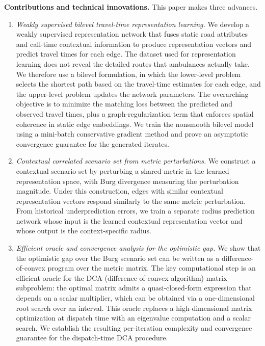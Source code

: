 \documentclass[11pt, letterpaper, oneside, reqno]{amsart}
\begin{document}
\noindent\textbf{Contributions and technical innovations.} This paper makes three advances.

\begin{enumerate}[leftmargin=7mm]
\item \textit{Weakly supervised bilevel travel-time representation learning.} 
We develop a weakly supervised representation network that fuses static road attributes and call-time contextual information to produce representation vectors and predict travel times for each edge. The dataset used for representation learning does not reveal the detailed routes that ambulances actually take. We therefore use a bilevel formulation, in which the lower-level problem selects the shortest path based on the travel-time estimates for each edge, and the upper-level problem updates the network parameters. The overarching objective is to minimize the matching loss between the predicted and observed travel times, plus a graph-regularization term that enforces spatial coherence in static edge embeddings. We train the nonsmooth bilevel model using a mini-batch conservative gradient method and prove an asymptotic convergence guarantee for the generated iterates.

\item \textit{Contextual correlated scenario set from metric perturbations.} We construct a contextual scenario set by perturbing a shared metric in the learned representation space, with Burg divergence measuring the perturbation magnitude. Under this construction, edges with similar contextual representation vectors respond similarly to the same metric perturbation. From historical underprediction errors, we train a separate radius prediction network whose input is the learned contextual representation vector and whose output is the context-specific radius.

\item \textit{Efficient oracle and convergence analysis for the optimistic gap.} We show that the optimistic gap over the Burg scenario set can be written as a difference-of-convex program over the metric matrix. The key computational step is an efficient oracle for the DCA (difference-of-convex algorithm) matrix subproblem: the optimal matrix admits a quasi-closed-form expression that depends on a scalar multiplier, which can be obtained via a one-dimensional root search over an interval. This oracle replaces a high-dimensional matrix optimization at dispatch time with an eigenvalue computation and a scalar search. We establish the resulting per-iteration complexity and convergence guarantee for the dispatch-time DCA procedure.
\end{enumerate}
\end{document}
